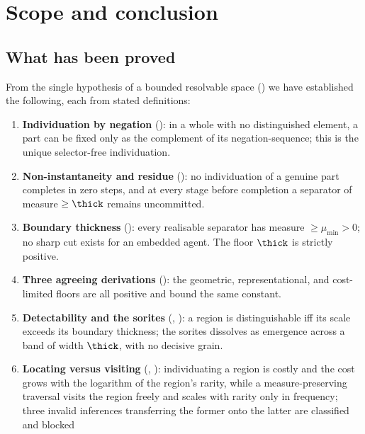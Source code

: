 
\section{Scope and conclusion}
\label{sec:scope}

\subsection{What has been proved}

From the single hypothesis of a bounded resolvable space () we have
established the following, each from stated definitions:

\begin{enumerate}[label=(\arabic*),leftmargin=2.4em]
\item \textbf{Individuation by negation} (): in a whole
with no distinguished element, a part can be fixed only as the complement of its
negation-sequence; this is the unique selector-free individuation.
\item \textbf{Non-instantaneity and residue} (): no
individuation of a genuine part completes in zero steps, and at every stage before
completion a separator of measure $\ge\thick$ remains uncommitted.
\item \textbf{Boundary thickness} (): every realisable
separator has measure $\ge\mu_{\min}>0$; no sharp cut exists for an embedded
agent. The floor $\thick$ is strictly positive.
\item \textbf{Three agreeing derivations} (): the
geometric, representational, and cost-limited floors are all positive and bound
the same constant.
\item \textbf{Detectability and the sorites} (,
): a region is distinguishable iff its scale exceeds its
boundary thickness; the sorites dissolves as emergence across a band of width
$\thick$, with no decisive grain.
\item \textbf{Locating versus visiting} (,
): individuating a region is costly and the cost grows
with the logarithm of the region's rarity, while a measure-preserving traversal
visits the region freely and scales with rarity only in frequency; three invalid
inferences transferring the former onto the latter are classified and blocked

\end{enumerate}
